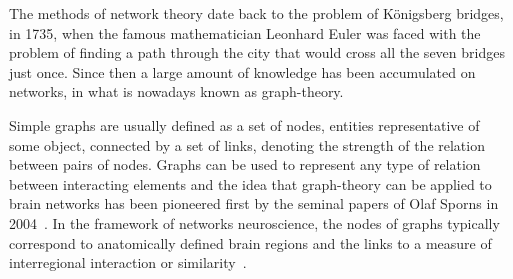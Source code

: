 
The methods of network theory date back to the problem of K{\"o}nigsberg bridges, in 1735, when the famous mathematician Leonhard Euler was faced with the problem of finding a path through the city that would cross all the seven bridges just once.
Since then a large amount of knowledge has been accumulated on networks, in what is nowadays known as graph-theory.

Simple graphs are usually defined as a set of nodes, entities representative of some object, connected by a set of links, denoting the strength of the relation between pairs of nodes.
Graphs can be used to represent any type of relation between interacting elements and the idea that graph-theory can be applied to brain networks has been pioneered first by the seminal papers of Olaf Sporns in 2004~\cite{Sporns2004}. In the framework of networks neuroscience, the nodes of graphs typically correspond to anatomically defined brain regions and the links to a measure of interregional interaction or similarity~\cite{bullmore2009}.

